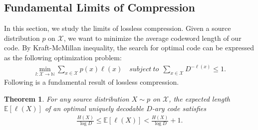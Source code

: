\documentclass{article}
\numberwithin{equation}{section}
\newcommand{\E}{\mathbb{E}}
\newcommand{\bbN}{\mathbb{N}}
\renewcommand{\cal}{\mathcal}
\theoremstyle{plain}
\newtheorem{theorem}{Theorem}[section]
\theoremstyle{definition}
\begin{document}
\subsection{Fundamental Limits of Compression}
In this section, we study the limits of lossless compression. Given a source distribution $p$ on $\cal{X}$, we want to minimize the average codeword length of our code. By Kraft-McMillan inequality, the search for optimal code can be expressed as the following optimization problem:
\begin{align*}
	\min_{l:\cal{X}\to\bbN}\sum_{x\in\cal{X}}p(x)\ell(x)\quad subject\ to\ \ \sum_{x\in\cal{X}}D^{-\ell(x)}\leq 1.
\end{align*}
Following is a fundamental result of lossless compression.
\begin{theorem}
For any source distribution $X\sim p$ on $\cal{X}$, the expected length $\E[\ell(X)]$ of an optimal uniquely decodable $D$-ary code satisfies
\begin{align}
	\frac{H(X)}{\log D}\leq\E\left[\ell(X)\right]<\frac{H(X)}{\log D}+1.\label{fundacomp}
\end{align}
\end{theorem}
\end{document}
